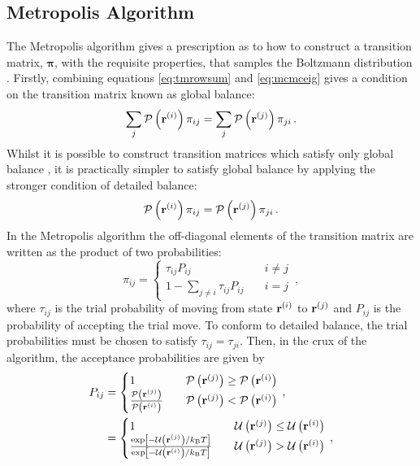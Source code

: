 \subsection{Metropolis Algorithm}
\label{ssec:metropolis}

The Metropolis algorithm gives a prescription as to how to construct a transition matrix, $\bm{\pi}$, with the requisite properties, that samples the Boltzmann distribution \cite{Metropolis1953}.
Firstly, combining equations \eqref{eq:tmrowsum} and \eqref{eq:mcmceig} gives a condition on the transition matrix known as global balance:
\begin{equation}
	\sum_j \mathcal{P}\left(\mathbf{r}^{\left(i\right)}\right)\pi_{ij} = \sum_j \mathcal{P}\left(\mathbf{r}^{\left(j\right)}\right)\pi_{ji}\,.
\end{equation} 
Whilst it is possible to construct transition matrices which satisfy only global balance \cite{Manousiouthakis1999,Suwa2010,Michel2014}, it is practically simpler to satisfy global balance by applying the stronger condition of detailed balance:
\begin{equation}
	\mathcal{P}\left(\mathbf{r}^{\left(i\right)}\right)\pi_{ij} = \mathcal{P}\left(\mathbf{r}^{\left(j\right)}\right)\pi_{ji}\,.
\end{equation}
In the Metropolis algorithm the off\--diagonal elements of the transition matrix are written as the product of two probabilities: 
\begin{equation}
	\pi_{ij} = \begin{cases} 
		\tau_{ij}P_{ij} \quad & i\neq j \\
		1-\sum\limits_{j\neq i}\tau_{ij}P_{ij} \quad & i=j
	\end{cases}\,,
\end{equation}
where $\tau_{ij}$ is the trial probability of moving from state $\mathbf{r}^{\left(i\right)}$ to $\mathbf{r}^{\left(j\right)}$ and $P_{ij}$ is the probability of accepting the trial move.
To conform to detailed balance, the trial probabilities must be chosen to satisfy $\tau_{ij}=\tau_{ji}$.
Then, in the crux of the algorithm, the acceptance probabilities are given by
\begin{align}
	 P_{ij}&=\begin{cases}
	 	1 \quad &\mathcal{P}\left(\mathbf{r}^{\left(j\right)}\right)\geq \mathcal{P}\left(\mathbf{r}^{\left(i\right)}\right) \\
	 	\frac{\mathcal{P}\left(\mathbf{r}^{\left(j\right)}\right)}{\mathcal{P}\left(\mathbf{r}^{\left(i\right)}\right)} \quad & \mathcal{P}\left(\mathbf{r}^{\left(j\right)}\right)< \mathcal{P}\left(\mathbf{r}^{\left(i\right)}\right)
	 \end{cases}\,, \\
	 &=\begin{cases}
	 	1 \quad &\mathcal{U}\left(\mathbf{r}^{\left(j\right)}\right)\leq \mathcal{U}\left(\mathbf{r}^{\left(i\right)}\right) \\
	 	\frac{\exp\left[-\mathcal{U}\left(\mathbf{r}^{\left(j\right)}\right)/k_\text{B} T\right]}{\exp\left[-\mathcal{U}\left(\mathbf{r}^{\left(i\right)}\right)/k_\text{B} T\right]} \quad & \mathcal{U}\left(\mathbf{r}^{\left(j\right)}\right)>\mathcal{U}\left(\mathbf{r}^{\left(i\right)}\right)
	 \end{cases}\,,
\end{align}
